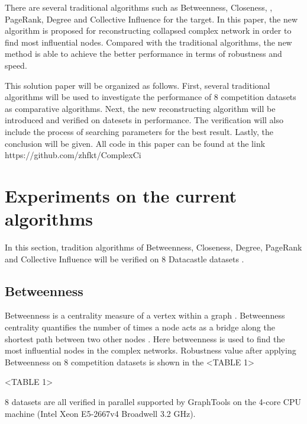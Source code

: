 \documentclass{article}
\begin{document}
	There are several traditional algorithms such as  Betweenness\cite{wikiBetweennesscentrality}, Closeness\cite{wikiClosenesscentrality}, \cite{wikiCentrality}, PageRank\cite{wikiPageRank}, Degree\cite{wikiCentrality} and Collective Influence\cite{morone2015influence}\cite{morone2016collective} for the target. In this paper, the new algorithm is proposed for reconstructing collapsed complex network in order to find most influential nodes. Compared with the traditional algorithms, the new method is able to achieve the better performance in terms of robustness and speed. 
	
	This solution paper will be organized as follows. First, several traditional algorithms will be used to investigate the performance of 8 competition datasets as comparative algorithms. Next, the new reconstructing algorithm will be introduced and verified on datesets in performance. The verification will also include the process of searching parameters for the best result. Lastly, the conclusion will be given. All code in this paper can be found at the link https://github.com/zhfkt/ComplexCi \cite{zhfktgithub} \cite{zhfkt2017887989}

	\section{Experiments on the current algorithms}
	
	In this section, tradition algorithms of Betweenness\cite{wikiBetweennesscentrality}, Closeness\cite{wikiClosenesscentrality}, Degree\cite{wikiCentrality}, PageRank\cite{wikiPageRank} and Collective Influence\cite{morone2015influence}\cite{morone2016collective} will be verified on 8 Datacastle datasets .


	\subsection{Betweenness}
	
	Betweenness is a centrality measure of a vertex within a graph . Betweenness centrality quantifies the number of times a node acts as a bridge along the shortest path between two other nodes \cite{wikiBetweennesscentrality}\cite{freeman1977set}. Here betweenness is used to find the most influential nodes in the complex networks. Robustness value after applying Betweenness on 8 competition datasets is shown in the <TABLE 1>
	
	<TABLE 1>
	
	8 datasets are all verified in parallel supported by GraphTools \cite{peixotographtool2014} on the 4-core CPU machine (Intel Xeon E5-2667v4 Broadwell 3.2 GHz). 
	
\end{document}
